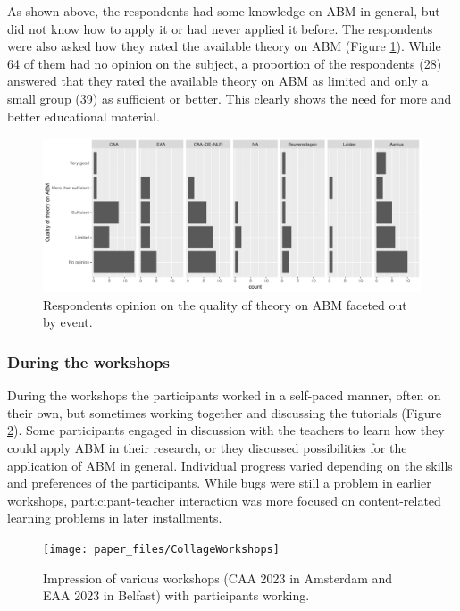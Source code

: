 \documentclass[
]{article}
\begin{document}
As shown above, the respondents had some knowledge on ABM in general, but did not know how to apply it or had never applied it before. The respondents were also asked how they rated the available theory on ABM (Figure \ref{fig:available-theory}). While 64 of them had no opinion on the subject, a proportion of the respondents (28) answered that they rated the available theory on ABM as limited and only a small group (39) as sufficient or better. This clearly shows the need for more and better educational material.

\begin{figure}
\centering
\includegraphics{paper_files/figure-latex/available-theory-1.pdf}
\caption{\label{fig:available-theory}Respondents opinion on the quality of theory on ABM faceted out by event.}
\end{figure}

\hypertarget{during-the-workshops}{%
\subsubsection{During the workshops}\label{during-the-workshops}}

During the workshops the participants worked in a self-paced manner, often on their own, but sometimes working together and discussing the tutorials (Figure \ref{fig:workshop-impression}). Some participants engaged in discussion with the teachers to learn how they could apply ABM in their research, or they discussed possibilities for the application of ABM in general. Individual progress varied depending on the skills and preferences of the participants. While bugs were still a problem in earlier workshops, participant-teacher interaction was more focused on content-related learning problems in later installments.

\begin{figure}
\texttt{[image: paper\_files/CollageWorkshops]} \caption{Impression of various workshops (CAA 2023 in Amsterdam and EAA 2023 in Belfast) with participants working.}\label{fig:workshop-impression}
\end{figure}
\end{document}
